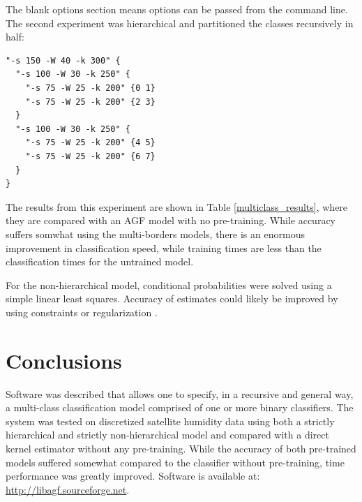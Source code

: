The blank options section means options can be passed from the command line.
The second experiment was hierarchical and partitioned the classes
recursively in half:
\begin{verbatim}
"-s 150 -W 40 -k 300" {
  "-s 100 -W 30 -k 250" {
    "-s 75 -W 25 -k 200" {0 1}
    "-s 75 -W 25 -k 200" {2 3}
  }
  "-s 100 -W 30 -k 250" {
    "-s 75 -W 25 -k 200" {4 5}
    "-s 75 -W 25 -k 200" {6 7}
  }
}
\end{verbatim}

The results from this experiment are shown in Table \ref{multiclass_results},
where they are compared with an AGF model with no pre-training.
While accuracy suffers somwhat using the multi-borders models,
there is an enormous improvement in classification speed, while
training times are less than the classification times for
the untrained model.

For the non-hierarchical model, conditional probabilities were solved
using a simple linear least squares.  Accuracy of estimates could likely
be improved by using constraints or regularization \citep{nr_inc2}.

\section{Conclusions}

Software was described that allows one to specify, in a recursive and
general way, a multi-class classification model comprised of one or more binary 
classifiers.  The system was tested on discretized satellite humidity data
using both a strictly hierarchical and strictly non-hierarchical model and
compared with a direct kernel estimator without any pre-training.
While the accuracy of both pre-trained models suffered somewhat compared to the
classifier without pre-training, time performance was greatly improved.
Software is available at: \url{http://libagf.sourceforge.net}.

